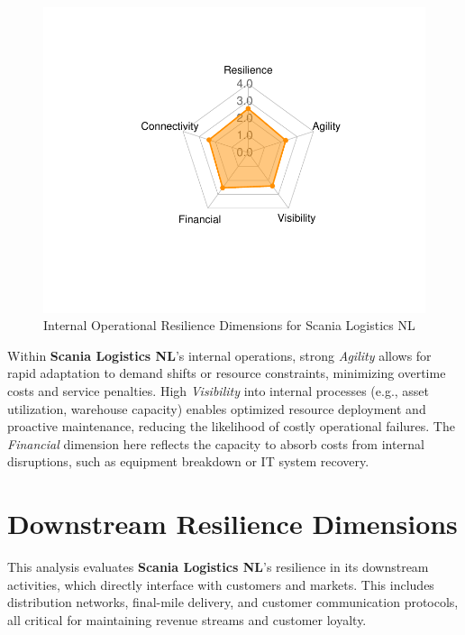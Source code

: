 \documentclass[
  oneside,
  open=any,
  fontsize=11pt]{scrbook}
\begin{document}
\begin{figure}[H]

{\centering \includegraphics[width=0.8\linewidth,height=\textheight,keepaspectratio]{example_3_files/figure-pdf/internal-radar-chart-1.pdf}

}

\caption{Internal Operational Resilience Dimensions for Scania Logistics
NL}

\end{figure}%

Within \textbf{Scania Logistics NL}'s internal operations, strong
\emph{Agility} allows for rapid adaptation to demand shifts or resource
constraints, minimizing overtime costs and service penalties. High
\emph{Visibility} into internal processes (e.g., asset utilization,
warehouse capacity) enables optimized resource deployment and proactive
maintenance, reducing the likelihood of costly operational failures. The
\emph{Financial} dimension here reflects the capacity to absorb costs
from internal disruptions, such as equipment breakdown or IT system
recovery.

\section{Downstream Resilience
Dimensions}\label{downstream-resilience-dimensions}

This analysis evaluates \textbf{Scania Logistics NL}'s resilience in its
downstream activities, which directly interface with customers and
markets. This includes distribution networks, final-mile delivery, and
customer communication protocols, all critical for maintaining revenue
streams and customer loyalty.
\end{document}

